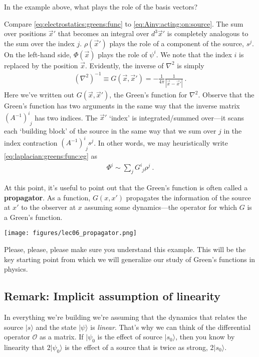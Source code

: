 \begin{exercise}
In the example above, what plays the role of the basis vectors? 
\end{exercise}

Compare \eqref{eq:electrostatics:greens:func} to \eqref{eq:Ainv:acting:on:source}. The sum over positions $\vec{x}'$ that becomes an integral over $d^3\vec{x}'$ is completely analogous to the sum over the index $j$. $\rho(\vec{x}')$ plays the role of a component of the source, $s^j$. On the left-hand side, $\Phi(\vec{x})$ plays the role of $\psi^i$. We note that the index $i$ is replaced by the position $\vec{x}$. Evidently, the inverse of $\nabla^2$ is simply
\begin{align}
  (\nabla^2)^{-1} \equiv G(\vec{x},\vec{x}') = -\frac{1}{4\pi} \frac{1}{|\vec{x}-\vec{x}'|} \ .
  \label{eq:laplacian:greens:func:eg}
\end{align}
Here we've written out $G(\vec{x},\vec{x}')$, the Green's function for $\nabla^2$. Observe that the Green's function has two arguments in the same way that the inverse matrix $\left(A^{-1}\right)^i_{\phantom{i}j}$ has two indices. The $\vec{x}'$ `index' is integrated/summed over---it scans each `building block' of the source in the same way that we sum over $j$ in the index contraction $\left(A^{-1}\right)^i_{\phantom{i}j}s^j$. In other words, we may heuristically write \eqref{eq:laplacian:greens:func:eg} as
\begin{align}
  \Phi^i \sim \sum_j G^i_{\phantom{i}j}\rho^j \ .
\end{align}

At this point, it's useful to point out that the Green's function is often called a \textbf{propagator}. As a function, $G(x,x')$ propagates the information of the source at $x'$ to the observer at $x$ assuming some dynamics---the operator for which $G$ is a Green's function.
\begin{center}
\texttt{[image: figures/lec06\_propagator.png]}
\end{center}

Please, please, please make sure you understand this example. This will be the key starting point from which we will generalize our study of Green's functions in physics.

\subsection{Remark: Implicit assumption of linearity}

In everything we're building we're assuming that the dynamics that relates  the source $|s\rangle$ and the state $|\psi\rangle$ is \emph{linear}. That's why we can think of the differential operator $\mathcal O$ as a matrix. If $|\psi_0$ is the effect of source $|s_0\rangle$, then you know by linearity that $2|\psi_0\rangle$ is the effect of a source that is twice as strong, $2|s_0\rangle$. 

